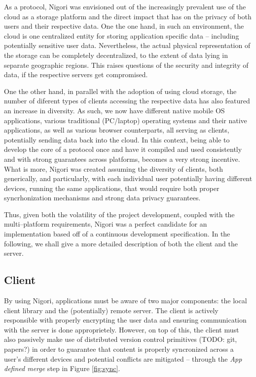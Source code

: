 As a protocol, Nigori was envisioned out of the increasingly prevalent use of the cloud as a storage platform and the direct impact that has on the privacy of both users and their respective data.
One the one hand, in such an environment, the cloud is one centralized entity for storing application specific data -- including potentially sensitive user data.
Nevertheless, the actual physical representation of the storage can be completely decentralized, to the extent of data lying in separate geographic regions.
This raises questions of the security and integrity of data, if the respective servers get compromised.

One the other hand, in parallel with the adoption of using cloud storage, the number of diferent types of clients accessing the respective data has also featured an increase in diversity.
As such, we now have different native mobile OS applications, various traditional (PC/laptop) operating systems and their native applications, as well as various browser counterparts, all serving as clients, potentially sending data back into the cloud.
In this context, being able to develop the core of a protocol once and have it compiled and used consistently and with strong guarantees across platforms, becomes a very strong incentive.
What is more, Nigori was created assuming the diversity of clients, both generically, and particularly, with each individual user potentially having different devices, running the same applications, that would require both proper syncrhonization mechanisms and strong data privacy guarantees.

Thus, given both the volatility of the project development, coupled with the multi--platform requirements, Nigori was a perfect candidate for an implementation based off of a continuous development specification.
In the following, we shall give a more detailed description of both the client and the server.

\subsection{Client}
By using Nigori, applications must be aware of two major components: the local client library and the (potentially) remote server.
The client is actively responsible with properly encrypting the user data and ensuring communication with the server is done approprietely.
However, on top of this, the client must also passively make use of distributed version control primitives (TODO: git, papers?) in order to guarantee that content is properly syncronized across a user's different devices and potential conflicts are mitigated -- through the \textit{App defined merge} step in Figure \ref{fig:sync}.

